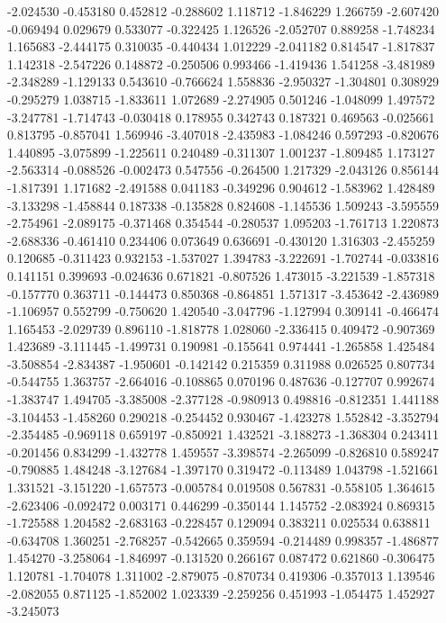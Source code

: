 -2.024530
-0.453180
0.452812
-0.288602
1.118712
-1.846229
1.266759
-2.607420
-0.069494
0.029679
0.533077
-0.322425
1.126526
-2.052707
0.889258
-1.748234
1.165683
-2.444175
0.310035
-0.440434
1.012229
-2.041182
0.814547
-1.817837
1.142318
-2.547226
0.148872
-0.250506
0.993466
-1.419436
1.541258
-3.481989
-2.348289
-1.129133
0.543610
-0.766624
1.558836
-2.950327
-1.304801
0.308929
-0.295279
1.038715
-1.833611
1.072689
-2.274905
0.501246
-1.048099
1.497572
-3.247781
-1.714743
-0.030418
0.178955
0.342743
0.187321
0.469563
-0.025661
0.813795
-0.857041
1.569946
-3.407018
-2.435983
-1.084246
0.597293
-0.820676
1.440895
-3.075899
-1.225611
0.240489
-0.311307
1.001237
-1.809485
1.173127
-2.563314
-0.088526
-0.002473
0.547556
-0.264500
1.217329
-2.043126
0.856144
-1.817391
1.171682
-2.491588
0.041183
-0.349296
0.904612
-1.583962
1.428489
-3.133298
-1.458844
0.187338
-0.135828
0.824608
-1.145536
1.509243
-3.595559
-2.754961
-2.089175
-0.371468
0.354544
-0.280537
1.095203
-1.761713
1.220873
-2.688336
-0.461410
0.234406
0.073649
0.636691
-0.430120
1.316303
-2.455259
0.120685
-0.311423
0.932153
-1.537027
1.394783
-3.222691
-1.702744
-0.033816
0.141151
0.399693
-0.024636
0.671821
-0.807526
1.473015
-3.221539
-1.857318
-0.157770
0.363711
-0.144473
0.850368
-0.864851
1.571317
-3.453642
-2.436989
-1.106957
0.552799
-0.750620
1.420540
-3.047796
-1.127994
0.309141
-0.466474
1.165453
-2.029739
0.896110
-1.818778
1.028060
-2.336415
0.409472
-0.907369
1.423689
-3.111445
-1.499731
0.190981
-0.155641
0.974441
-1.265858
1.425484
-3.508854
-2.834387
-1.950601
-0.142142
0.215359
0.311988
0.026525
0.807734
-0.544755
1.363757
-2.664016
-0.108865
0.070196
0.487636
-0.127707
0.992674
-1.383747
1.494705
-3.385008
-2.377128
-0.980913
0.498816
-0.812351
1.441188
-3.104453
-1.458260
0.290218
-0.254452
0.930467
-1.423278
1.552842
-3.352794
-2.354485
-0.969118
0.659197
-0.850921
1.432521
-3.188273
-1.368304
0.243411
-0.201456
0.834299
-1.432778
1.459557
-3.398574
-2.265099
-0.826810
0.589247
-0.790885
1.484248
-3.127684
-1.397170
0.319472
-0.113489
1.043798
-1.521661
1.331521
-3.151220
-1.657573
-0.005784
0.019508
0.567831
-0.558105
1.364615
-2.623406
-0.092472
0.003171
0.446299
-0.350144
1.145752
-2.083924
0.869315
-1.725588
1.204582
-2.683163
-0.228457
0.129094
0.383211
0.025534
0.638811
-0.634708
1.360251
-2.768257
-0.542665
0.359594
-0.214489
0.998357
-1.486877
1.454270
-3.258064
-1.846997
-0.131520
0.266167
0.087472
0.621860
-0.306475
1.120781
-1.704078
1.311002
-2.879075
-0.870734
0.419306
-0.357013
1.139546
-2.082055
0.871125
-1.852002
1.023339
-2.259256
0.451993
-1.054475
1.452927
-3.245073
